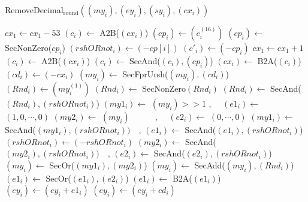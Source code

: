 \documentclass[runningheads]{llncs}
\begin{document}
\begin{algorithm}[H]
  \caption{RemoveDecimal$_{\text{round}}((my_i), (ey_i), (sy_i), (cx_i))$}
  $cx_1 \leftarrow cx_1 - 53$
  $(c_i) \leftarrow$ A2B($(cx_i)$)\;
  $(cp_i) \leftarrow (c_i^{(16)})$\;
  $(cp_i) \leftarrow$ SecNonZero($cp_i$)\;
  $(rshORnot_i) \leftarrow (-cp[i])$\; 
  $(c'_i) \leftarrow (- cp_i)$
  $cx_1 \leftarrow cx_1 + 1$\;
  $(c_i) \leftarrow$ A2B($(cx_i)$)\;
  $(c_i) \leftarrow$ SecAnd($(c_i), (cp_i)$)\;
  $(cx_i) \leftarrow$ B2A($(c_i)$)\;
  $(cd_i) \leftarrow (-cx_i)$\;
  $(my_i) \leftarrow$ SecFprUrsh($(my_i), (cd_i)$)
  $(Rnd_i) \leftarrow (my_i^{(1)})$\;
  $(Rnd_i) \leftarrow$ SecNonZero$(Rnd_i)$\;
  $(Rnd_i) \leftarrow$ SecAnd($(Rnd_i), (rshORnot_i)$)\;
  $(my1_i) \leftarrow$ $(my_i)>>1$ , $\quad (e1_i) \leftarrow$ $(1,0,\cdots, 0)$\;
  $(my2_i) \leftarrow$ $(my_i)\qquad \quad$,  $\quad(e2_i) \leftarrow$ $(0,\cdots, 0)$\;
  $(my1_i) \leftarrow$ SecAnd($(my1_i), (rshORnot_i))\quad $, $(e1_i) \leftarrow$ SecAnd($(e1_i), (rshORnot_i)$)\;
  $(rshORnot_i) \leftarrow (-rshORnot_i)$\;
  $(my2_i) \leftarrow$ SecAnd($(my2_i), (rshORnot_i))\quad $, $(e2_i) \leftarrow$ SecAnd($(e2_i), (rshORnot_i)$)\;
  $(my_i) \leftarrow$ SecOr($(my1_i), (my2_i)$)\;
  $(my_i) \leftarrow$ SecAdd($(my_i), (Rnd_i)$)\;
  $(e1_i) \leftarrow$ SecOr($(e1_i), (e2_i)$)\;
  $(e1_i) \leftarrow$ B2A($(e1_i)$)\; 
  $(ey_i) \leftarrow (ey_i + e1_i) $\;
  $(ey_i) \leftarrow (ey_i + cd_i)$\; 
\;
\end{algorithm}
\end{document}
